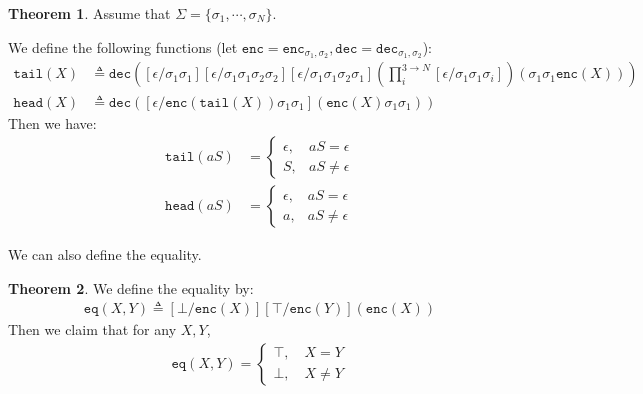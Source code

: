 \documentclass{article}
\theoremstyle{definition}
\newtheorem{theorem}{Theorem}[section]
\begin{document}
\begin{theorem}
    Assume that $\Sigma = \{\sigma_1,\cdots,\sigma_N\}$.

    We define the following functions (let $\mathtt{enc}=\mathtt{enc}_{\sigma_1,\sigma_2},\mathtt{dec}=\mathtt{dec}_{\sigma_1,\sigma_2}$):
    \begin{align}
        \mathtt{tail}(X) & \triangleq \mathtt{dec}\left([\epsilon/\sigma_1\sigma_1][\epsilon/\sigma_1\sigma_1\sigma_2\sigma_2][\epsilon/\sigma_1\sigma_1\sigma_2\sigma_1](\prod_i^{3\rightarrow N}[\epsilon/\sigma_1\sigma_1\sigma_i]) (\sigma_1\sigma_1\mathtt{enc}(X))\right) \\
        \mathtt{head}(X) & \triangleq \mathtt{dec}([\epsilon/\mathtt{enc}(\mathtt{tail}(X))\sigma_1\sigma_1](\mathtt{enc}(X)\sigma_1\sigma_1))
    \end{align}
    Then we have:
    \begin{align}
        \mathtt{tail}(aS) & = \begin{cases}
                                  \epsilon, & aS=\epsilon     \\
                                  S,        & aS\neq \epsilon
                              \end{cases} \\
        \mathtt{head}(aS) & = \begin{cases}
                                  \epsilon, & aS=\epsilon     \\
                                  a,        & aS\neq \epsilon
                              \end{cases}
    \end{align}
\end{theorem}

We can also define the equality.

\begin{theorem}
    We define the equality by:
    \begin{align}
        \mathtt{eq}(X,Y) \triangleq [\bot/\mathtt{enc}(X)][\top/\mathtt{enc}(Y)](\mathtt{enc}(X))
    \end{align}
    Then we claim that for any $X,Y$,
    \begin{align}
        \mathtt{eq}(X,Y) = \begin{cases}
                               \top,\quad X=Y \\
                               \bot,\quad X\neq Y
                           \end{cases}
    \end{align}
\end{theorem}
\end{document}
